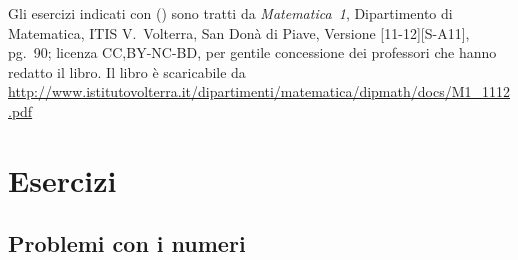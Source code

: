 
Gli esercizi indicati con (\croce) sono tratti da \emph{Matematica~1}, 
Dipartimento di Matematica, ITIS V.~Volterra, San Donà di Piave, Versione 
[11-12][S-A11], pg.~90;
licenza CC,BY-NC-BD, per gentile concessione dei professori che hanno redatto il 
libro.
Il libro è scaricabile da 
\url{
http://www.istitutovolterra.it/dipartimenti/matematica/dipmath/docs/M1_1112.pdf}

\section{Esercizi}

\subsection{Problemi con i numeri}

